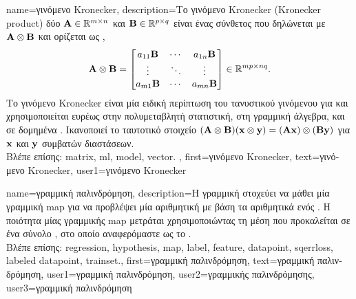 {name={\foreignlanguage{greek}{γινόμενο} Kronecker}, 
	description={\foreignlanguage{greek}{Το γινόμενο} Kronecker 
		(Kronecker product) \foreignlanguage{greek}{δύο}  ${\bf A} \in \mathbb{R}^{m \times n}$ 
		\foreignlanguage{greek}{και ${\bf B} \in \mathbb{R}^{p \times q}$ είναι ένας σύνθετος}  
		\foreignlanguage{greek}{που δηλώνεται με ${\bf A} \otimes {\bf B}$ και ορίζεται ως} \cite{GolubVanLoanBook}, \cite{HornMatAnalysis}
    		\[
      		{\bf A} \otimes {\bf B} =
      		\begin{bmatrix}
        		a_{11}{\bf B} & \cdots & a_{1n}{\bf B} \\
        		\vdots & \ddots & \vdots \\
        		a_{m1}{\bf B} & \cdots & a_{mn}{\bf B}
      		\end{bmatrix}
      		\in \mathbb{R}^{mp \times nq}.
    		\]
    		\foreignlanguage{greek}{Το γινόμενο} Kronecker \foreignlanguage{greek}{είναι μία ειδική περίπτωση του τανυστικού 
		γινόμενου για}  \foreignlanguage{greek}{και χρησιμοποιείται ευρέως στην πολυμεταβλητή 
		στατιστική, στη γραμμική άλγεβρα, και σε δομημένα}  . 
		\foreignlanguage{greek}{Ικανοποιεί το ταυτοτικό στοιχείο $({\bf A} \otimes {\bf B})({\bf x} \otimes {\bf y}) = ({\bf A}{\bf x}) \otimes ({\bf B}{\bf y})$ 
		για}  ${\bf x}$ \foreignlanguage{greek}{και ${\bf y}$ συμβατών διαστάσεων}. \\
		\foreignlanguage{greek}{Βλέπε επίσης:} \gls{matrix}, \gls{ml}, \gls{model}, \gls{vector}. },
	first={\foreignlanguage{greek}{γινόμενο} Kronecker},
	text={\foreignlanguage{greek}{γινόμενο} Kronecker},
	user1={\foreignlanguage{greek}{γινόμενο} Kronecker} %
}

{name={\foreignlanguage{greek}{γραμμική παλινδρόμηση}}, 
	description={\foreignlanguage{greek}{Η γραμμική} 
		 \foreignlanguage{greek}{στοχεύει να μάθει μία γραμμική} \gls{map}  
		\foreignlanguage{greek}{για να προβλέψει μία αριθμητική}  \foreignlanguage{greek}{με βάση τα αριθμητικά} 
		 \foreignlanguage{greek}{ενός} . \foreignlanguage{greek}{Η ποιότητα μίας γραμμικής} 
		\gls{map}  \foreignlanguage{greek}{μετράται χρησιμοποιώντας τη μέση}  
		 \foreignlanguage{greek}{που προκαλείται σε ένα σύνολο} , 
		\foreignlanguage{greek}{στο οποίο αναφερόμαστε ως το} .\\
		\foreignlanguage{greek}{Βλέπε επίσης:} \gls{regression}, \gls{hypothesis}, \gls{map}, \gls{label}, \gls{feature}, \gls{datapoint},  \gls{sqerrloss}, 
		\gls{labeled datapoint}, \gls{trainset}.},
	first={\foreignlanguage{greek}{γραμμική παλινδρόμηση}},
	text={\foreignlanguage{greek}{γραμμική παλινδρόμηση}},
	user1={\foreignlanguage{greek}{γραμμική παλινδρόμηση}}, %
	user2={\foreignlanguage{greek}{γραμμικής παλινδρόμησης}}, %
	user3={\foreignlanguage{greek}{γραμμική παλινδρόμηση}} %
}

